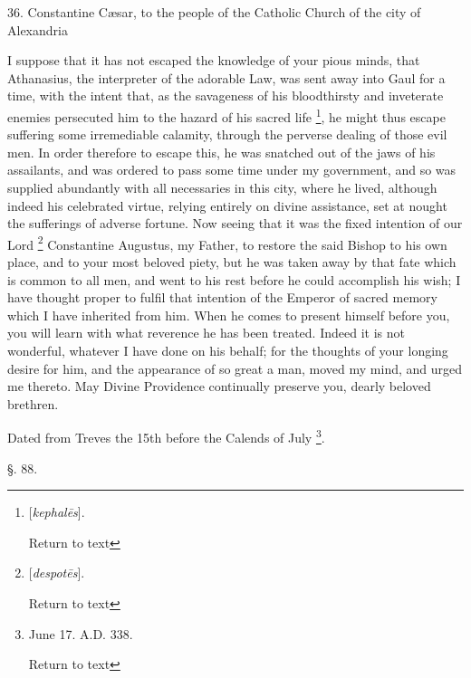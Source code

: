 36. Constantine Cæsar, to the people of the
Catholic Church of the city of Alexandria

I suppose that it has not escaped the knowledge
of your pious minds, that Athanasius, the interpreter of the adorable
Law, was sent away into Gaul for a time, with the intent that, as the
savageness of his bloodthirsty and inveterate enemies persecuted him
to the hazard of his sacred life \footnote{[\emph{kephal\={e}s}].

Return to text}, he might thus escape suffering some irremediable calamity,
through the perverse dealing of those evil men. In order therefore to
escape this, he was snatched out of the jaws of his assailants, and
was ordered to pass some time under my government, and so was supplied
abundantly with all necessaries in this city, where he lived, although
indeed his celebrated virtue, relying entirely on divine assistance,
set at nought the sufferings of adverse fortune. Now seeing that it
was the fixed intention of our Lord \footnote{[\emph{despot\={e}s}].

Return to text} Constantine Augustus, my Father, to restore the said Bishop to
his own place, and to your most beloved piety, but he was taken away
by that fate which is common to all men, and went to his rest before
he could accomplish his wish; I have thought proper to fulfil
that intention of the Emperor of sacred memory which I have inherited
from him. When he comes to present himself before you, you will learn
with what reverence he has been treated. Indeed it is not wonderful,
whatever I have done on his behalf; for the thoughts of your longing
desire for him, and the appearance of so great a man, moved my mind,
and urged me thereto. May Divine Providence continually preserve you,
dearly beloved brethren.

Dated from Treves the 15th before the Calends of
July \footnote{June 17. A.D. 338.

Return to text}.

§. 88.

